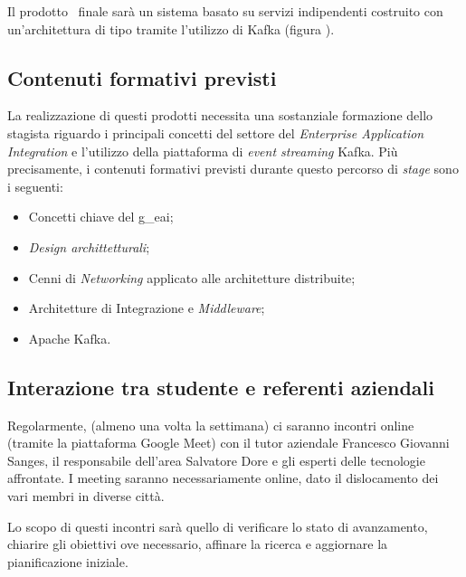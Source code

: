 Il prodotto \software\ finale sarà un sistema basato su servizi indipendenti costruito con un'architettura di tipo  tramite l'utilizzo di Kafka (figura \thefigure).

\subsection{Contenuti formativi previsti}

La realizzazione di questi prodotti necessita una sostanziale formazione dello stagista riguardo i principali concetti del settore del \textit{Enterprise Application Integration} e l'utilizzo della piattaforma di \textit{event streaming} Kafka.
Più precisamente, i contenuti formativi previsti durante questo percorso di \textit{stage} sono i seguenti:
\begin{itemize}
  \item Concetti chiave del \gls{g_eai};
  \item \textit{Design archittetturali};
  \item Cenni di \textit{Networking} applicato alle architetture distribuite;
  \item Architetture di Integrazione e \textit{Middleware};
  \item Apache Kafka.
\end{itemize}

\subsection{Interazione tra studente e referenti aziendali}
Regolarmente, (almeno una volta la settimana) ci saranno incontri online (tramite la piattaforma Google Meet) con il tutor aziendale Francesco Giovanni Sanges, il responsabile dell’area  Salvatore Dore e gli esperti delle tecnologie affrontate.
I meeting saranno necessariamente online, dato il dislocamento dei vari membri in diverse città.

Lo scopo di questi incontri sarà quello di verificare lo stato di avanzamento, chiarire gli obiettivi ove necessario, affinare la ricerca e aggiornare la pianificazione iniziale.

